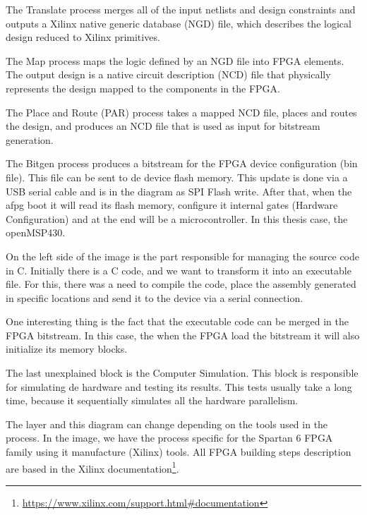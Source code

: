 The Translate process merges all of the input netlists and design constraints and outputs a Xilinx native generic database (NGD) file, which describes the logical design reduced to Xilinx primitives. 

The Map process maps the logic defined by an NGD file into FPGA elements. The output design is a native circuit description (NCD) file that physically represents the design mapped to the components in the FPGA.

The Place and Route (PAR) process takes a mapped NCD file, places and routes the design, and produces an NCD file that is used as input for bitstream generation.

The Bitgen process produces a bitstream for the FPGA device configuration (bin file). This file can be sent to de device flash memory. This update is done via a USB serial cable and is in the diagram as SPI Flash write. After that, when the afpg boot it will read its flash memory, configure it internal gates (Hardware Configuration) and at the end will be a microcontroller. In this thesis case, the openMSP430.

On the left side of the image is the part responsible for managing the source code in C. Initially there is a C code, and we want to transform it into an executable file. For this, there was a need to compile the code, place the assembly generated in specific locations and send it to the device via a serial connection.

One interesting thing is the fact that the executable code can be merged in the FPGA bitstream. In this case, the when the FPGA load the bitstream it will also initialize its memory blocks. 

The last unexplained block is the Computer Simulation. This block is responsible for simulating de hardware and testing its results. This tests usually take a long time, because it sequentially simulates all the hardware parallelism. 

The layer and this diagram can change depending on the tools used in the process. In the image, we have the process specific for the Spartan 6 FPGA family using it manufacture (Xilinx) tools. All FPGA building steps description are based in the Xilinx documentation\footnote{\url{https://www.xilinx.com/support.html\#documentation}}.
